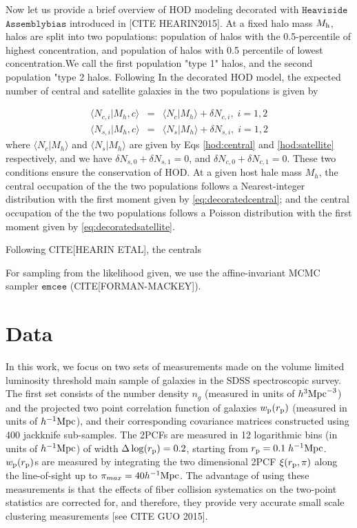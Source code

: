 \documentclass[12pt, preprint]{aastex}
\begin{document}
Now let us provide a brief overview of HOD modeling decorated with $\mathtt{Heaviside}$ $\mathtt{Assemblybias}$ introduced in [CITE HEARIN2015]. At a fixed halo mass $M_{\rm h}$, halos are split into two populations: population of halos with the 0.5-percentile of highest concentration, and population of halos with 0.5 percentile of lowest concentration.We call the first population "type 1" halos, and the second population "type 2 halos. Following In the decorated HOD model, the expected number of central and satellite galaxies in the two populations is given by

\begin{eqnarray}
\langle N_{c,i} | M_{h},c\rangle &=& \langle N_{c} | M_{h}\rangle + \delta N _{c,i}, \; i=1,2 \label{eq:decoratedcentral} \\
\langle N_{s,i} | M_{h},c\rangle &=& \langle N_{s} | M_{h}\rangle + \delta N _{s,i}, \; i=1,2 \label{eq:decoratedsatellite}
\end{eqnarray}
where $\langle N_{c} | M_{h}\rangle$ and $\langle N_{s} | M_{h}\rangle$ are given by Eqs \ref{hod:central} and \ref{hod:satellite} respectively, and we have $\delta N_{s,0} + \delta N_{s,1} = 0$, and $\delta N_{c,0} + \delta N_{c,1} = 0$. These two conditions ensure the conservation of HOD. At a given host hale mass $M_{h}$, the central occupation of the the two populations follows a Nearest-integer distribution with the first moment given by \ref{eq:decoratedcentral}; and the central occupation of the the two populations follows a Poisson distribution with the first moment given by \ref{eq:decoratedsatellite}.




Following CITE[HEARIN ETAL], the centrals   


For sampling from the likelihood given, we use the affine-invariant MCMC sampler $\mathtt{emcee}$ (CITE[FORMAN-MACKEY]).


\section{Data}

In this work, we focus on two sets of measurements made on the volume limited luminosity threshold main sample of galaxies 
in the SDSS spectroscopic survey. The first set consists of the number density $n_{g}$ (measured in units of $h^{3}\rm{Mpc}^{-3}$) 
and the projected two point correlation function of galaxies $w_{\rm{p}}(r_{\rm{p}})$ (measured in units of $h^{-1}\rm{Mpc}$), 
and their corresponding covariance matrices constructed using 400 jackknife sub-samples. 
The 2PCFs are measured in 12 logarithmic bins (in units of $h^{-1}\rm{Mpc}$) of width $\Delta \log(r_{\rm p}) = 0.2$, 
starting from $r_{\rm{p}} = 0.1 \; h^{-1}\rm{Mpc}$. $w_{\rm{p}}(r_{\rm{p}})$s are measured by integrating the two dimensional 
2PCF $\xi(r_{\rm{p}} , \pi)$ along the line-of-sight up to $\pi_{max}=40 h^{-1}\rm{Mpc}$. The advantage of using these measurements 
is that the effects of fiber collision systematics on the two-point statistics are corrected for, and therefore, they provide very 
accurate small scale clustering measurements [see CITE GUO 2015].
\end{document}
